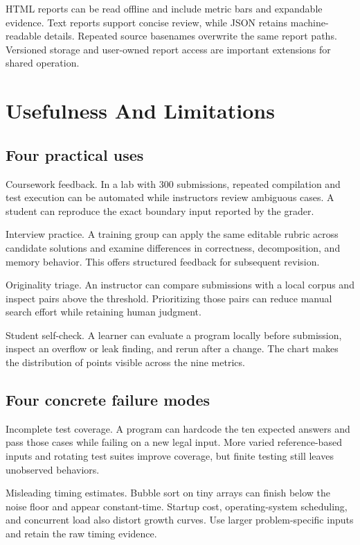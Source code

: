 \documentclass[conference]{IEEEtran}
\begin{document}
HTML reports can be read offline and include metric bars and expandable evidence. Text reports support concise review, while JSON retains machine-readable details. Repeated source basenames overwrite the same report paths. Versioned storage and user-owned report access are important extensions for shared operation.


\newpage

\section{Usefulness And Limitations}

\subsection{Four practical uses}

Coursework feedback. In a lab with 300 submissions, repeated compilation and test execution can be automated while instructors review ambiguous cases. A student can reproduce the exact boundary input reported by the grader.


Interview practice. A training group can apply the same editable rubric across candidate solutions and examine differences in correctness, decomposition, and memory behavior. This offers structured feedback for subsequent revision.


Originality triage. An instructor can compare submissions with a local corpus and inspect pairs above the threshold. Prioritizing those pairs can reduce manual search effort while retaining human judgment.


Student self-check. A learner can evaluate a program locally before submission, inspect an overflow or leak finding, and rerun after a change. The chart makes the distribution of points visible across the nine metrics.


\subsection{Four concrete failure modes}

Incomplete test coverage. A program can hardcode the ten expected answers and pass those cases while failing on a new legal input. More varied reference-based inputs and rotating test suites improve coverage, but finite testing still leaves unobserved behaviors.


Misleading timing estimates. Bubble sort on tiny arrays can finish below the noise floor and appear constant-time. Startup cost, operating-system scheduling, and concurrent load also distort growth curves. Use larger problem-specific inputs and retain the raw timing evidence.
\end{document}
